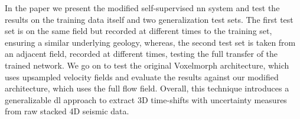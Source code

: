 In the paper we present the modified self-supervised \acl{nn} system and test the results on the training data itself and two generalization test sets. The first test set is on the same field but recorded at different times to the training set, ensuring a similar underlying geology, whereas, the second test set is taken from an adjacent field, recorded at different times, testing the full transfer of the trained network. We go on to test the original Voxelmorph architecture, which uses upsampled velocity fields and evaluate the results against our modified architecture, which uses the full flow field. Overall, this technique introduces a generalizable \acl{dl} approach to extract 3D time-shifts with uncertainty measures from raw stacked 4D seismic data.